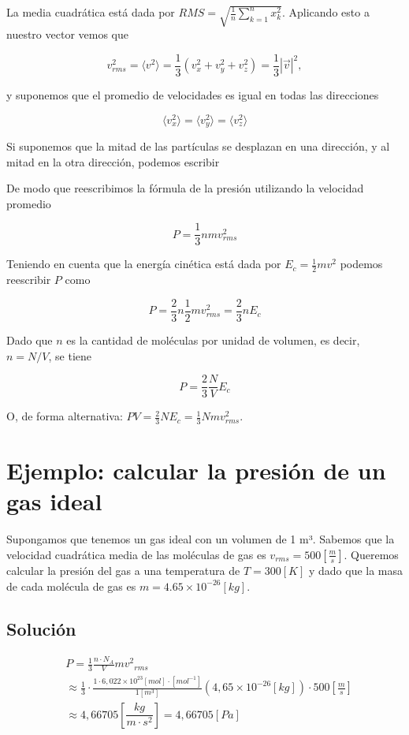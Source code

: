 \documentclass{article}
\begin{document}
La media cuadrática está dada por $RMS = \sqrt{\frac 1 n \sum_{k=1}^{n}x_k^2}$.
Aplicando esto a nuestro vector vemos que

\[
  v_{rms}^2 = \langle {v}^2 \rangle =  \frac{1}{3}\left(v_x^2+v_y^2+v_z^2\right) = \frac{1}{3} |\vec{v}|^2,
\]

y suponemos que el promedio de velocidades es igual en todas las direcciones

\[
  \langle v_x^2 \rangle = \langle v_y^2 \rangle = \langle v_z^2 \rangle
\]

Si suponemos que la mitad de las partículas se desplazan en una dirección, y al
mitad en la otra dirección, podemos escribir

De modo que reescribimos la fórmula de la presión utilizando la velocidad
promedio

\[
  P = \frac{1}{3}nmv_{rms}^2
\]

Teniendo en cuenta que la energía cinética está dada por $E_c = \frac 1 2 m
  v^2$ podemos reescribir $P$ como

\[
  P = \frac{2}{3}n\frac{1}{2}mv_{rms}^2=\frac{2}{3}nE_c
\]

Dado que $n$ es la cantidad de moléculas por unidad de volumen, es decir,
$n=N/V$, se tiene

\[
  P = \frac{2}{3}\frac{N}{V}E_c
\]

O, de forma alternativa: $PV = \frac{2}{3}NE_c=\frac{1}{3}Nmv_{rms}^2$.

\section*{Ejemplo: calcular la presión de un gas ideal}

Supongamos que tenemos un gas ideal con un volumen de 1 m³. Sabemos que la
velocidad cuadrática media de las moléculas de gas es
$v_{rms}=500\left[\frac{m}{s}\right]$. Queremos calcular la presión del gas a
una temperatura de $T=300 [K]$ y dado que la masa de cada molécula de gas es
$m=4.65\times10^{-26} [kg]$.

\subsection*{Solución}

\begin{equation*}
 \begin{split}
    &P=\frac{1}{3}\frac{n \cdot N_A}{V} m {v^2}_{rms}
    \\
    &\approx\frac{1}{3}\cdot\frac{1 \cdot 6,022\times 10^{23}[mol]\cdot [mol^{-1}]}{1[m^3]} (4,65\times 10^{-26}[kg])\cdot 500\left[\frac m s\right]
    \\
    &\approx 4,66705 \left[\dfrac{kg}{m\cdot s^2}\right] = 4,66705 \left[Pa\right]
  \end{split}
\end{equation*} 
\end{document}
